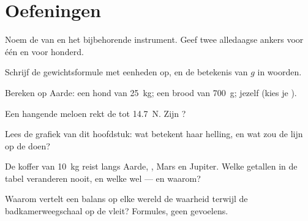 \section{Oefeningen}

\begin{exercise}[$\star$]\label{exo:g9:weight-vs-mass:1}
Noem de  van  en het bijbehorende
instrument. Geef twee alledaagse ankers voor één
 en voor honderd.
\end{exercise}

\begin{exercise}[$\star$]\label{exo:g9:weight-vs-mass:2}
Schrijf de gewichtsformule met eenheden op, en de
betekenis van $g$ in woorden.
\end{exercise}

\begin{exercise}[$\star$]\label{exo:g9:weight-vs-mass:3}
Bereken  op Aarde: een hond van \qty{25}{kg}; een brood
van \qty{700}{g}; jezelf (kies je ).
\end{exercise}

\begin{exercise}[$\star$]\label{exo:g9:weight-vs-mass:4}
Een hangende meloen rekt de  tot \qty{14.7}{N}.
Zijn ?
\end{exercise}

\begin{exercise}[$\star$]\label{exo:g9:weight-vs-mass:5}
Lees de grafiek van dit hoofdstuk: wat betekent haar helling, en wat
zou de lijn op de  doen?
\end{exercise}

\begin{exercise}[$\star$]\label{exo:g9:weight-vs-mass:6}
De koffer van \qty{10}{kg} reist langs Aarde, , Mars en
Jupiter. Welke getallen in de tabel veranderen nooit, en welke wel ---
en waarom?
\end{exercise}

\begin{exercise}[$\star$]\label{exo:g9:weight-vs-mass:7}
Waarom vertelt een balans op elke wereld de waarheid terwijl de
badkamerweegschaal op de  vleit? Formules, geen gevoelens.
\end{exercise}

